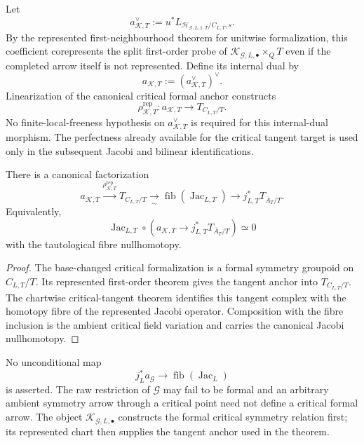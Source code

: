 Let
\[
a_{\mathcal K,T}^\vee
:=
u^*
L_{\mathcal H_{\mathcal G,L,1,T}/C_{L,T},s}.
\]
By the represented first-neighbourhood theorem for unitwise formalization, this
coefficient corepresents the split first-order probe of
$\mathcal K_{\mathcal G,L,\bullet}\times_QT$ even if the completed arrow itself is
not represented.  Define its internal dual by
\[
a_{\mathcal K,T}:=(a_{\mathcal K,T}^\vee)^\vee.
\]
Linearization of the canonical critical formal anchor constructs
\[
\rho_{\mathcal K,T}^{\mathrm{rep}}:
a_{\mathcal K,T}
\longrightarrow
T_{C_{L,T}/T}.
\]
No finite-local-freeness hypothesis on $a_{\mathcal K,T}^\vee$ is required for
this internal-dual morphism.  The perfectness already available for the critical
tangent target is used only in the subsequent Jacobi and bilinear identifications.

\begin{theorem}
\label{thm:symmetry-noether-jacobi-zero-mode-factorization}
There is a canonical factorization
\[
\boxed{
a_{\mathcal K,T}
\xrightarrow{\rho_{\mathcal K,T}^{\mathrm{rep}}}
T_{C_{L,T}/T}
\xrightarrow[\sim]{}
\operatorname{fib}(\operatorname{Jac}_{L,T})
\longrightarrow
j_{L,T}^*T_{\overline A_T/T}.
}
\]
Equivalently,
\[
\operatorname{Jac}_{L,T}
\circ
\left(
a_{\mathcal K,T}
\to
j_{L,T}^*T_{\overline A_T/T}
\right)
\simeq0
\]
with the tautological fibre nullhomotopy.
\end{theorem}

\begin{proof}
The base-changed critical formalization is a formal symmetry groupoid on
$C_{L,T}/T$.  Its represented first-order theorem gives the tangent anchor into
$T_{C_{L,T}/T}$.  The chartwise critical-tangent theorem identifies this tangent
complex with the homotopy fibre of the represented Jacobi operator.  Composition
with the fibre inclusion is the ambient critical field variation and carries the
canonical Jacobi nullhomotopy.
\end{proof}

\begin{remark}
\label{rem:symmetry-noether-why-the-formalized-critical-groupoid-is-used}
No unconditional map
\[
j_L^*a_{\mathcal G}
\longrightarrow
\operatorname{fib}(\operatorname{Jac}_L)
\]
is asserted.  The raw restriction of $\mathcal G$ may fail to be formal and an
arbitrary ambient symmetry arrow through a critical point need not define a critical
formal arrow.  The object
$\mathcal K_{\mathcal G,L,\bullet}$ constructs the formal critical symmetry
relation first; its represented chart then supplies the tangent anchor used in the
theorem.
\end{remark}


